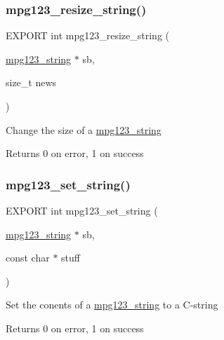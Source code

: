 \subsubsection{\texorpdfstring{mpg123\+\_\+resize\+\_\+string()}{mpg123\_resize\_string()}}
{\footnotesize\ttfamily E\+X\+P\+O\+RT int mpg123\+\_\+resize\+\_\+string (\begin{DoxyParamCaption}\item[{\hyperlink{structmpg123__string}{mpg123\+\_\+string} $\ast$}]{sb,  }\item[{size\+\_\+t}]{news }\end{DoxyParamCaption})}

Change the size of a \hyperlink{structmpg123__string}{mpg123\+\_\+string} \begin{DoxyReturn}{Returns}
0 on error, 1 on success 
\end{DoxyReturn}
\mbox{\label{group__mpg123__metadata_gaf1f4594c3c8dc6beead0448cf81edfa5}} 
\subsubsection{\texorpdfstring{mpg123\+\_\+set\+\_\+string()}{mpg123\_set\_string()}}
{\footnotesize\ttfamily E\+X\+P\+O\+RT int mpg123\+\_\+set\+\_\+string (\begin{DoxyParamCaption}\item[{\hyperlink{structmpg123__string}{mpg123\+\_\+string} $\ast$}]{sb,  }\item[{const char $\ast$}]{stuff }\end{DoxyParamCaption})}

Set the conents of a \hyperlink{structmpg123__string}{mpg123\+\_\+string} to a C-\/string \begin{DoxyReturn}{Returns}
0 on error, 1 on success 
\end{DoxyReturn}
\mbox{\label{group__mpg123__metadata_ga94df6ed2103e9ed084bc5c970e6178a9}} 
